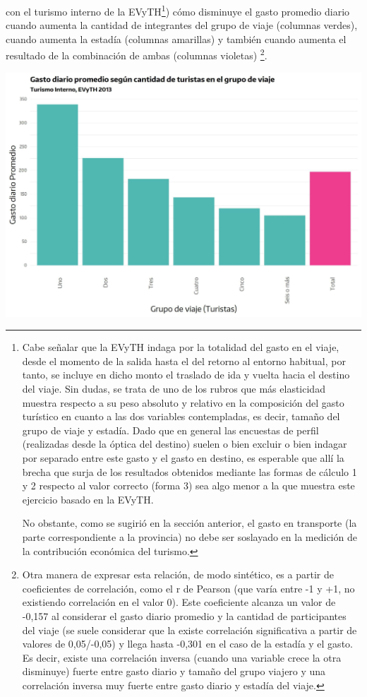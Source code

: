 \documentclass[
]{book}
\begin{document}
con el turismo interno de la EVyTH\footnote{Cabe señalar que la EVyTH indaga por la totalidad del gasto en el viaje, desde el momento de la salida hasta el del retorno al entorno habitual, por tanto, se incluye en dicho monto el traslado de ida y vuelta hacia el destino del viaje. Sin dudas, se trata de uno de los rubros que más elasticidad muestra respecto a su peso absoluto y relativo en la composición del gasto turístico en cuanto a las dos variables contempladas, es decir, tamaño del grupo de viaje y estadía. Dado que en general las encuestas de perfil (realizadas desde la óptica del destino) suelen o bien excluir o bien indagar por separado entre este gasto y el gasto en destino, es esperable que allí la brecha que surja de los resultados obtenidos mediante las formas de cálculo 1 y 2 respecto al valor correcto (forma 3) sea algo menor a la que muestra este ejercicio basado en la EVyTH.

  No obstante, como se sugirió en la sección anterior, el gasto en transporte (la parte correspondiente a la provincia) no debe ser soslayado en la medición de la contribución económica del turismo.}) cómo disminuye el gasto promedio diario cuando aumenta la cantidad de integrantes del grupo de viaje (columnas verdes), cuando aumenta la estadía (columnas amarillas) y también cuando aumenta el resultado de la combinación de ambas (columnas violetas) \footnote{Otra manera de expresar esta relación, de modo sintético, es a partir de coeficientes de correlación, como el r de Pearson (que varía entre -1 y +1, no existiendo correlación en el valor 0). Este coeficiente alcanza un valor de -0,157 al considerar el gasto diario promedio y la cantidad de participantes del viaje (se suele considerar que la existe correlación significativa a partir de valores de 0,05/-0,05) y llega hasta -0,301 en el caso de la estadía y el gasto. Es decir, existe una correlación inversa (cuando una variable crece la otra disminuye) fuerte entre gasto diario y tamaño del grupo viajero y una correlación inversa muy fuerte entre gasto diario y estadía del viaje.}.

\begin{center}\includegraphics[width=1\linewidth,height=1\textheight]{imagenes/DT4_grafico18_a} \end{center}
\end{document}
